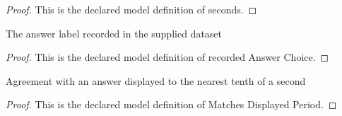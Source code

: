 \begin{proof}
  This is the declared model definition of seconds.
\end{proof}
\begin{definition}
  \label{def:physics:phyx-mini-0262:phyxminiproblems-problemphyxmini0262-recordedanswerchoice}
  The answer label recorded in the supplied dataset
\end{definition}
\begin{proof}
  This is the declared model definition of recorded Answer Choice.
\end{proof}
\begin{definition}
  \label{def:physics:phyx-mini-0262:phyxminiproblems-problemphyxmini0262-matchesdisplayedperiod}
  Agreement with an answer displayed to the nearest tenth of a second
\end{definition}
\begin{proof}
  This is the declared model definition of Matches Displayed Period.
\end{proof}
